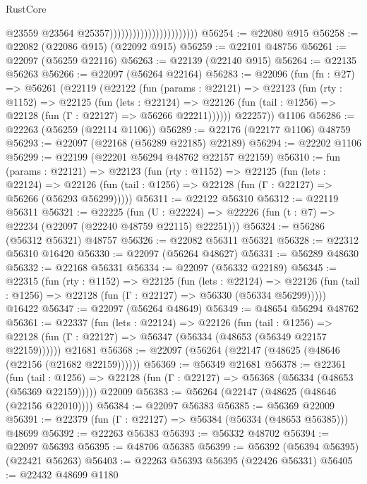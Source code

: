 \begin{lexlean}{RustCore}
\begin{coremodule}
                                                  @23559
                                                  @23564
                                                  @25357)))))))))))))))))))))))
@56254 := @22080 @915
@56258 := @22082 (@22086 @915) (@22092 @915)
@56259 := @22101 @48756
@56261 := @22097 (@56259 @22116)
@56263 := @22139 (@22140 @915)
@56264 := @22135 @56263
@56266 := @22097 (@56264 @22164)
@56283 := @22096
    (fun (fn : @27) =>
    @56261
      (@22119
        (@22122
          (fun (params : @22121) =>
          @22123
            (fun (rty : @1152) =>
            @22125
              (fun (lets : @22124) =>
              @22126 (fun (tail : @1256) => @22128 (fun (Γ : @22127) => @56266 @22211))))))
        @22257))
    @1106
@56286 := @22263 (@56259 (@22114 @1106))
@56289 := @22176 (@22177 @1106) @48759
@56293 := @22097 (@22168 (@56289 @22185) @22189)
@56294 := @22202 @1106
@56299 := @22199 (@22201 @56294 @48762 @22157 @22159)
@56310 := fun (params : @22121) =>
  @22123
    (fun (rty : @1152) =>
    @22125
      (fun (lets : @22124) =>
      @22126 (fun (tail : @1256) => @22128 (fun (Γ : @22127) => @56266 (@56293 @56299)))))
@56311 := @22122 @56310
@56312 := @22119 @56311
@56321 := @22225
    (fun (U : @22224) => @22226 (fun (t : @7) => @22234 (@22097 (@22240 @48759 @22115) @22251)))
@56324 := @56286 (@56312 @56321) @48757
@56326 := @22082 @56311 @56321
@56328 := @22312 @56310 @16420
@56330 := @22097 (@56264 @48627)
@56331 := @56289 @48630
@56332 := @22168 @56331
@56334 := @22097 (@56332 @22189)
@56345 := @22315
    (fun (rty : @1152) =>
    @22125
      (fun (lets : @22124) =>
      @22126 (fun (tail : @1256) => @22128 (fun (Γ : @22127) => @56330 (@56334 @56299)))))
    @16422
@56347 := @22097 (@56264 @48649)
@56349 := @48654 @56294 @48762
@56361 := @22337
    (fun (lets : @22124) =>
    @22126
      (fun (tail : @1256) =>
      @22128 (fun (Γ : @22127) => @56347 (@56334 (@48653 (@56349 @22157 @22159))))))
    @21681
@56368 := @22097 (@56264 (@22147 (@48625 (@48646 (@22156 (@21682 @22159))))))
@56369 := @56349 @21681
@56378 := @22361
    (fun (tail : @1256) => @22128 (fun (Γ : @22127) => @56368 (@56334 (@48653 (@56369 @22159)))))
    @22009
@56383 := @56264 (@22147 (@48625 (@48646 (@22156 @22010))))
@56384 := @22097 @56383
@56385 := @56369 @22009
@56391 := @22379 (fun (Γ : @22127) => @56384 (@56334 (@48653 @56385))) @48699
@56392 := @22263 @56383
@56393 := @56332 @48702
@56394 := @22097 @56393
@56395 := @48706 @56385
@56399 := @56392 (@56394 @56395) (@22421 @56263)
@56403 := @22263 @56393 @56395 (@22426 @56331)
@56405 := @22432 @48699 @1180

\end{coremodule}
\end{lexlean}
